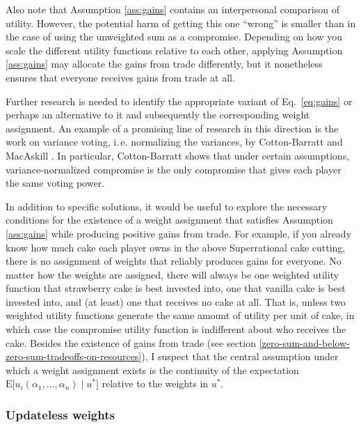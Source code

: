 Also note that Assumption \ref{ass:gains} contains an interpersonal comparison of
utility. However, the potential harm of getting this one ``wrong'' is
smaller than in the case of using the unweighted sum as a compromise.
Depending on how you scale the different utility functions relative to
each other, applying Assumption \ref{ass:gains} may allocate the gains from trade
differently, but it nonetheless ensures that everyone receives gains
from trade at all.

Further research is needed to identify the appropriate variant of Eq.~\eqref{eq:gains} or
perhaps an alternative to it and subsequently the corresponding weight
assignment. An example of a promising line of research in this direction
is the work on variance voting, i.\,e. normalizing the variances, by
Cotton-Barratt \citeyear{Cotton-Barratt2013-ql} and
MacAskill \citeyear{MacAskill2014-ca}. In particular,
Cotton-Barratt shows that under certain assumptions, variance-normalized
compromise is the only compromise that gives each player the same voting
power.

In addition to specific solutions, it would be useful to explore the
necessary conditions for the existence of a weight assignment that
satisfies Assumption \ref{ass:gains} while producing positive gains from trade. For
example, if you already know how much cake each player owns in the above
Superrational cake cutting, there is no assignment of weights that
reliably produces gains for everyone. No matter how the weights are
assigned, there will always be one weighted utility function that
strawberry cake is best invested into, one that vanilla cake is best
invested into, and (at least) one that receives no cake at all. That is,
unless two weighted utility functions generate the same amount of
utility per unit of cake, in which case the compromise utility function
is indifferent about who receives the cake. Besides the existence of
gains from trade (see section
\ref{zero-sum-and-below-zero-sum-tradeoffs-on-resources}), I suspect that the
central assumption under which a weight assignment exists is the
continuity of the expectation
\(\mathrm{E}\lbrack u_{i}(\alpha_{1},\dotsc,\alpha_{n})\mid u^{*}\rbrack\) relative to
the weights in \(u^{*}\).

\hypertarget{updateless-weights}{\subsubsection{Updateless
weights}\label{updateless-weights}}

